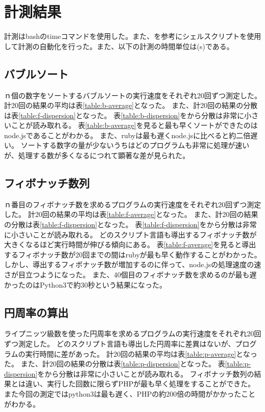 \chapter{計測結果}
\label{cha:result}
計測はbashのtimeコマンドを使用した。また、\cite{bash}を参考にシェルスクリプトを使用して計測の自動化を行った。また、以下の計測の時間単位は(s)である。
\section{バブルソート}
ｎ個の数字をソートするバブルソートの実行速度をそれぞれ20回ずつ測定した。
計20回の結果の平均は表\ref{table:b-average}となった。
また、計20回の結果の分散は表\ref{table:f-dispersion}となった。
表\ref{table:b-dispersion}をから分散は非常に小さいことが読み取れる。
表\ref{table:b-average}を見ると最も早くソートができたのはnode.jsであることがわかる。
また、rubyは最も遅くnode.jsに比べると約二倍遅い。
ソートする数字の量が少ないうちはどのプログラムも非常に処理が速いが、処理する数が多くなるにつれて顕著な差が見られた。

\section{フィボナッチ数列}
ｎ番目のフィボナッチ数を求めるプログラムの実行速度をそれぞれ20回ずつ測定した。
計20回の結果の平均は表\ref{table:f-average}となった。
また、計20回の結果の分散は表\ref{table:f-dispersion}となった。
表\ref{table:f-dispersion}をから分散は非常に小さいことが読み取れる。
どのスクリプト言語も導出するフィボナッチ数が大きくなるほど実行時間が伸びる傾向にある。
表\ref{table:f-average}を見ると導出するフィボナッチ数が20回までの間はrubyが最も早く動作することがわかった。
しかし、導出するフィボナッチ数が増加するのに伴って、node.jsの処理速度の速さが目立つようになった。
また、40個目のフィボナッチ数を求めるのが最も遅かったのはPython3で約30秒という結果になった。


\section{円周率の算出}
ライプニッツ級数を使った円周率を求めるプログラムの実行速度をそれぞれ20回ずつ測定した。
どのスクリプト言語も導出した円周率に差異はないが、プログラムの実行時間に差があった。
計20回の結果の平均は表\ref{table:p-average}となった。
また、計20回の結果の分散は表\ref{table:p-dispersion}となった。
表\ref{table:p-dispersion}をから分散は非常に小さいことが読み取れる。
フィボナッチ数列の結果とは違い、実行した回数に限らずPHPが最も早く処理をすることができた。
また今回の測定ではpython3は最も遅く、PHPの約200倍の時間がかかったことがわかる。

